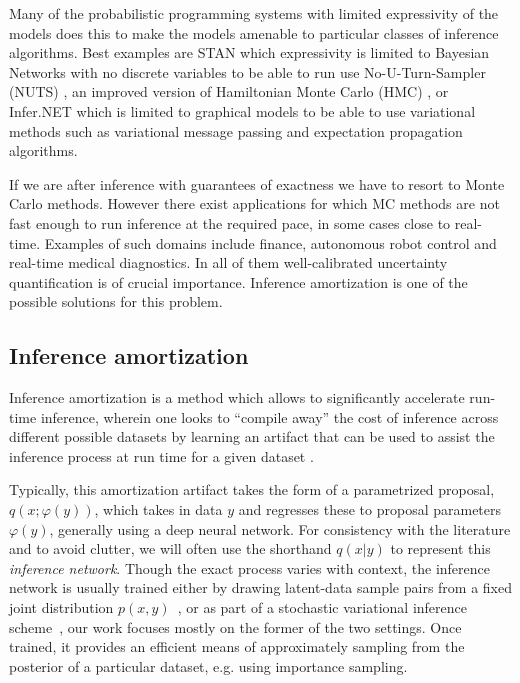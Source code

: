 \documentclass[12pt]{article}
\begin{document}
Many of the probabilistic programming systems with limited expressivity of the models does this to make the models amenable to particular classes of inference algorithms. 
Best examples are STAN which expressivity is limited to Bayesian Networks with no discrete variables to be able to run use No-U-Turn-Sampler (NUTS) \citep{NUTS}, an improved version of Hamiltonian Monte Carlo (HMC) \citep{HMC}, or Infer.NET which is limited to graphical models to be able to use variational methods such as variational message passing \citep{variationalmessagepassing} and expectation propagation \citep{EP} algorithms.

If we are after inference with guarantees of exactness we have to resort to Monte Carlo methods.
However there exist applications for which MC methods are not fast enough to run inference at the required pace, in some cases close to real-time.
Examples of such domains include finance, autonomous robot control and real-time medical diagnostics.
In all of them well-calibrated uncertainty quantification is of crucial importance.
Inference amortization is one of the possible solutions for this problem.


\subsection{Inference amortization}

Inference amortization is a method which allows to significantly accelerate run-time inference, wherein one looks to ``compile away'' the cost of inference
across different possible datasets
by learning an artifact that can be used to assist the inference process
at run time for a given dataset
\citep{StuhlmullerEtAl2013, VAE, ritchie2016deep, PaigeWood2016, LeEtAl2016, LeEtAl2017, FIVO, NaessethEtAl2017}.

Typically, this amortization
artifact takes the form of a parametrized proposal, $q(x ; \varphi(y))$, which takes
in data $y$ and regresses these to proposal parameters $\varphi(y)$, generally using
a deep neural network.
For consistency with the literature and to avoid clutter, we will often
use the shorthand $q(x|y)$ to represent this \emph{inference network}.
Though the exact process varies with context,
the inference network is usually trained either by drawing latent-data
sample pairs from a fixed joint distribution
$p(x,y)$~\citep{ritchie2016deep,PaigeWood2016,LeEtAl2016}, or 
as part of a stochastic variational inference scheme~\citep{HoffmanEtAl2013,VAE,RezendeEtAl2014},
our work focuses mostly on the former of the two settings.
Once trained, it provides an efficient means of approximately
sampling from the posterior of a particular dataset, e.g. using importance sampling.
\end{document}
